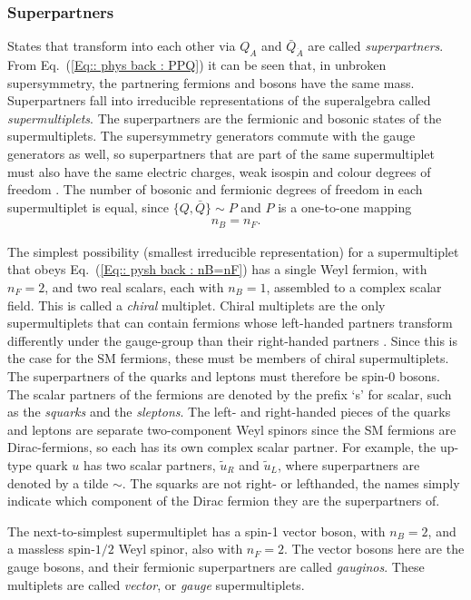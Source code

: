 \documentclass[twoside,english]{uiofysmaster}
\begin{document}
\subsubsection{Superpartners}\label{Sec:: phys back : Superpartners}

States that transform into each other via $Q_A$ and $\bar{Q}_{\dot{A}}$ are called \textit{superpartners}. From Eq.~(\ref{Eq:: phys back : PPQ}) it can be seen that, in unbroken supersymmetry, the partnering fermions and bosons have the same mass. Superpartners fall into irreducible representations of the superalgebra called \textit{supermultiplets}. The superpartners are the fermionic and bosonic states of the supermultiplets. The supersymmetry generators commute with the gauge generators as well, so superpartners that are part of the same supermultiplet must also have the same electric charges, weak isospin and colour degrees of freedom \cite{Martin:1997ns}. The number of bosonic and fermionic degrees of freedom in each supermultiplet is equal, since $\{Q, \bar{Q}\} \sim P$ and $P$ is a one-to-one mapping 
\begin{align}\label{Eq:: pysh back : nB=nF}
n_B = n_F.
\end{align}

The simplest possibility (smallest irreducible representation) for a supermultiplet that obeys Eq.~(\ref{Eq:: pysh back : nB=nF}) has a single Weyl fermion, with $n_F =2$, and two real scalars, each with $n_B=1$, assembled to a complex scalar field. This is called a \textit{chiral} multiplet. Chiral multiplets are the only supermultiplets that can contain fermions whose left-handed partners transform differently under the gauge-group than their right-handed partners \cite{Martin:1997ns}. Since this is the case for the SM fermions, these must be members of chiral supermultiplets. The superpartners of the quarks and leptons must therefore be spin-0 bosons. The scalar partners of the fermions are denoted by the prefix `s' for scalar, such as the \textit{squarks} and the \textit{sleptons}. The left- and right-handed pieces of the quarks and leptons are separate two-component Weyl spinors since the SM fermions are Dirac-fermions, so each has its own complex scalar partner. For example, the up-type quark $u$ has two scalar partners, $\widetilde{u}_R$ and $\widetilde{u}_L$, where superpartners are denoted by a tilde $\sim$. The squarks are not right- or lefthanded, the names simply indicate which component of the Dirac fermion they are the superpartners of.

The next-to-simplest supermultiplet has a spin-1 vector boson, with $n_B=2$, and a massless spin-$1/2$ Weyl spinor, also with $n_F=2$. The vector bosons here are the gauge bosons, and their fermionic superpartners are called \textit{gauginos}. These multiplets are called \textit{vector}, or \textit{gauge} supermultiplets. 
\end{document}

